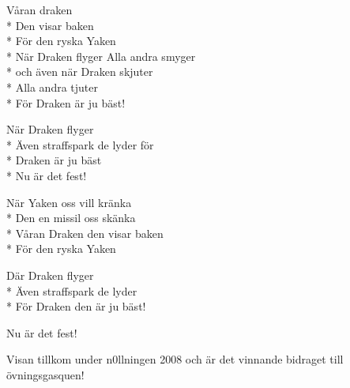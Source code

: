 \begin{SongText}
    \begin{SongVerse}
        Våran draken\\*%
        Den visar baken\\*%
        För den ryska Yaken\\*%
        När Draken flyger Alla andra smyger\\*%
        och även när Draken skjuter\\*%
        Alla andra tjuter\\*%
        För Draken är ju bäst!
    \end{SongVerse}
    \begin{SongVerse}
        När Draken flyger\\*%
        Även straffspark de lyder för\\*%
        Draken är ju bäst\\*%
        Nu är det fest!
    \end{SongVerse}
    \begin{SongVerse}
        När Yaken oss vill kränka\\*%
        Den en missil oss skänka\\*%
        Våran Draken den visar baken\\*%
        För den ryska Yaken
    \end{SongVerse}
    \begin{SongVerse}
        Där Draken flyger\\*%
        Även straffspark de lyder\\*%
        För Draken den är ju bäst!
    \end{SongVerse}
    \begin{SongVerse}
        Nu är det fest!
    \end{SongVerse}
    \begin{SongInfo}
        Visan tillkom under n0llningen 2008 och är det vinnande bidraget till övningsgasquen!
    \end{SongInfo}
\end{SongText}
